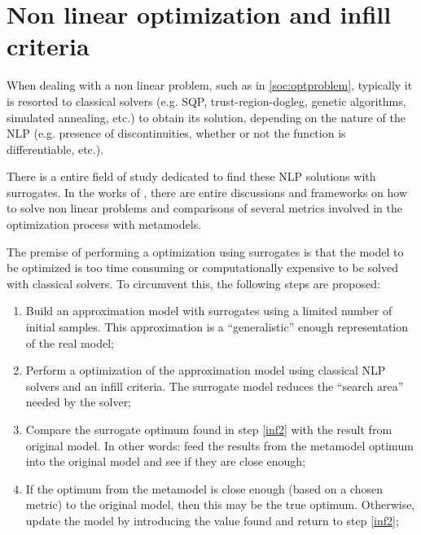 \documentclass[../msc-thesis.tex]{subfiles}
\begin{document}
\chapter{Non linear optimization and infill criteria}

When dealing with a non linear problem, such as in \autoref{soc:optproblem}, 
typically it is resorted to classical solvers (e.g. SQP, trust-region-dogleg, 
genetic algorithms, simulated annealing, etc.) to obtain its solution, 
depending on the nature of the NLP (e.g. presence of discontinuities, whether 
or not the function is differentiable, etc.).

There is a entire field of study dedicated to find these NLP solutions with 
\kriging surrogates. In the works of \textcite{Jones2001, Sasena2002, 
Forrester2008, Alexandrov2000}, there are entire discussions and frameworks 
on how to solve non linear problems and comparisons of several metrics 
involved in the optimization process with metamodels.

The premise of performing a optimization using surrogates is that the model 
to be optimized is too time consuming or computationally expensive to be 
solved with classical solvers. To circumvent this, the following steps are 
proposed: 

\begin{enumerate}
    \item Build an approximation model with \kriging surrogates using a 
    limited number of initial samples. This approximation is a ``generalistic'' 
    enough representation of the real model; \label{inf2}

    \item Perform a optimization of the approximation model using classical NLP
    solvers and an infill criteria. The surrogate model reduces the 
    ``search area'' needed by the solver; \label{inf2}

    \item Compare the surrogate optimum found in step \ref{inf2} with the 
    result from original model. In other words: feed the results from the 
    \kriging metamodel optimum into the original model and see if they are 
    close enough; \label{inf3}

    \item If the optimum from the metamodel is close enough (based on a 
    chosen metric) to the original model, then this may be the true optimum. 
    Otherwise, update the \kriging model by introducing the value found and 
    return to step \ref{inf2}; \label{inf4}
    
\end{enumerate}
\end{document}
